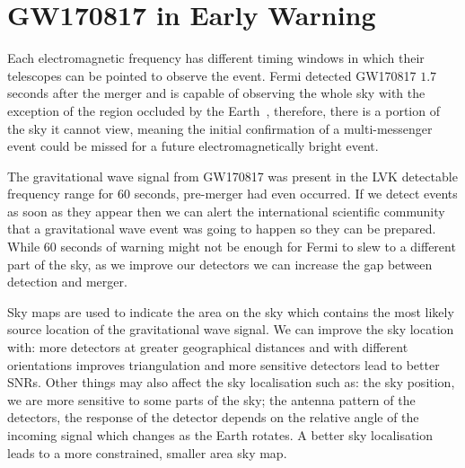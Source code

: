 \section{GW170817 in Early Warning}

Each electromagnetic frequency has different timing windows in which their telescopes can be pointed to observe the event. Fermi detected GW170817 $1.7$ seconds after the merger and is capable of observing the whole sky with the exception of the region occluded by the Earth~\cite{Fermi:2022}, therefore, there is a portion of the sky it cannot view, meaning the initial confirmation of a multi-messenger event could be missed for a future electromagnetically bright event.

The gravitational wave signal from GW170817 was present in the LVK detectable frequency range for $60$ seconds, pre-merger had even occurred. If we detect events as soon as they appear then we can alert the international scientific community that a gravitational wave event was going to happen so they can be prepared. While $60$ seconds of warning might not be enough for Fermi to slew to a different part of the sky, as we improve our detectors we can increase the gap between detection and merger.

Sky maps are used to indicate the area on the sky which contains the most likely source location of the gravitational wave signal. We can improve the sky location with: more detectors at greater geographical distances and with different orientations improves triangulation and more sensitive detectors lead to better SNRs. Other things may also affect the sky localisation such as: the sky position, we are more sensitive to some parts of the sky; the antenna pattern of the detectors, the response of the detector depends on the relative angle of the incoming signal which changes as the Earth rotates. A better sky localisation leads to a more constrained, smaller area sky map.

